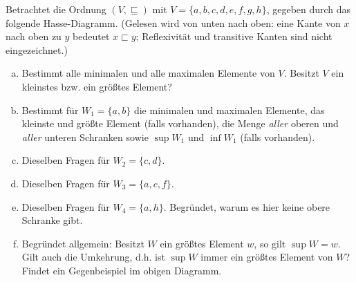 Betrachtet die Ordnung $(V,\sqsubseteq)$ mit $V=\{a,b,c,d,e,f,g,h\}$, gegeben durch das folgende Hasse-Diagramm. (Gelesen wird von unten nach oben: eine Kante von $x$ nach oben zu $y$ bedeutet $x\sqsubset y$; Reflexivität und transitive Kanten sind nicht eingezeichnet.)

\begin{center}
\end{center}

\begin{enumerate}[a)]
  \item Bestimmt alle minimalen und alle maximalen Elemente von $V$. Besitzt $V$ ein kleinstes bzw. ein größtes Element?
  \item Bestimmt für $W_1=\{a,b\}$ die minimalen und maximalen Elemente, das kleinste und größte Element (falls vorhanden), die Menge \emph{aller} oberen und \emph{aller} unteren Schranken sowie $\sup W_1$ und $\inf W_1$ (falls vorhanden).
  \item Dieselben Fragen für $W_2=\{c,d\}$.
  \item Dieselben Fragen für $W_3=\{a,c,f\}$.
  \item Dieselben Fragen für $W_4=\{a,h\}$. Begründet, warum es hier keine obere Schranke gibt.
  \item Begründet allgemein: Besitzt $W$ ein größtes Element $w$, so gilt $\sup W = w$. Gilt auch die Umkehrung, d.h. ist $\sup W$ immer ein größtes Element von $W$? Findet ein Gegenbeispiel im obigen Diagramm.
\end{enumerate}

